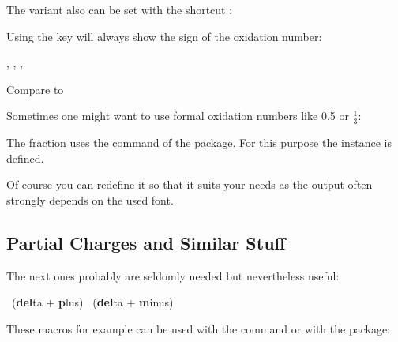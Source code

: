 \documentclass[load-preamble+]{cnltx-doc}
\begin{document}
The  variant also can be set with the shortcut \sarg:
\begin{example}
   
\end{example}

Using the  key will always show the sign of the
oxidation number:
\begin{example}
  , , , 
\end{example}

\begin{example}
  Compare  to 
\end{example}

Sometimes one might want to use formal oxidation numbers like \num{.5} or
$\frac{1}{3}$:
\begin{example}
   
\end{example}

The fraction uses the  command of the  package.  For
this purpose the instance  is defined.
\begin{sourcecode}
\end{sourcecode}
Of course you can redefine it so that it suits your needs as the output often
strongly depends on the used font.

\subsection{Partial Charges and Similar Stuff}\label{ssec:partialladungen}

The next ones probably are seldomly needed but nevertheless useful:
\begin{commands}
   \delp\ (\textbf{del}ta + \textbf{p}lus)
   \delm\ (\textbf{del}ta + \textbf{m}inus)
   \fdelp
   \fdelm
\end{commands}

These macros for example can be used with the  command or with the
 package:
\begin{example}
   \hspace*{1cm}
\end{example}
\end{document}
